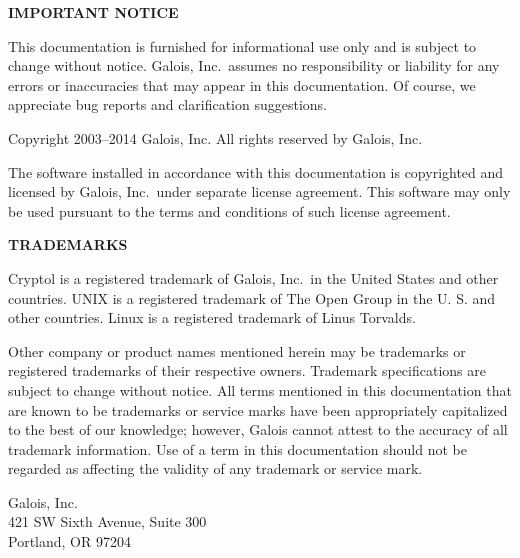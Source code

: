 \noindent
{\bf IMPORTANT NOTICE}

{\small
  This documentation is furnished for informational use only
  and is subject to change without notice. Galois, Inc.~assumes no
  responsibility or liability for any errors or inaccuracies that may
  appear in this documentation. Of course, we appreciate bug reports
  and clarification suggestions.

  Copyright 2003--2014 Galois, Inc. All rights reserved by Galois,
  Inc.

  The software installed in accordance with this documentation is
  copyrighted and licensed by Galois, Inc.~under separate license
  agreement. This software may only be used pursuant to the terms and
  conditions of such license agreement.}

\noindent
{\bf TRADEMARKS}

{\small 
  Cryptol is a registered trademark of Galois, Inc.~in the United
  States and other countries. UNIX is a registered trademark of The
  Open Group in the U. S.  and other countries. Linux is a registered
  trademark of Linus Torvalds.



  Other company or product names mentioned herein may be trademarks or
  registered trademarks of their respective owners. Trademark
  specifications are subject to change without notice. All terms
  mentioned in this documentation that are known to be trademarks or
  service marks have been appropriately capitalized to the best of our
  knowledge; however, Galois cannot attest to the accuracy of all
  trademark information. Use of a term in this documentation should
  not be regarded as affecting the validity of any trademark or
  service mark.

\vspace{0.5in}
\noindent
Galois, Inc.\\
421 SW Sixth Avenue, Suite 300 \\
Portland, OR 97204
}


